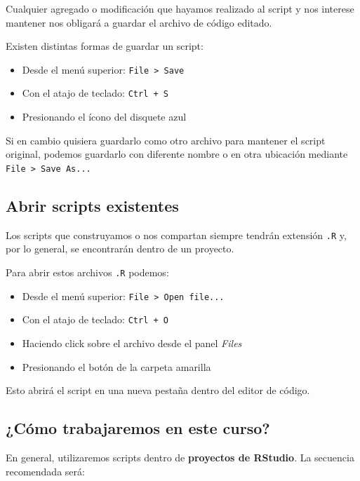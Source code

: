 \documentclass[
  spanish,
  a4paper,
]{scrbook}
\begin{document}
Cualquier agregado o modificación que hayamos realizado al script y nos
interese mantener nos obligará a guardar el archivo de código editado.

Existen distintas formas de guardar un script:

\begin{itemize}
\item
  Desde el menú superior: \texttt{File\ \textgreater{}\ Save}
\item
  Con el atajo de teclado: \texttt{Ctrl\ +\ S}
\item
  Presionando el ícono del disquete azul 💾
\end{itemize}

Si en cambio quisiera guardarlo como otro archivo para mantener el
script original, podemos guardarlo con diferente nombre o en otra
ubicación mediante \texttt{File\ \textgreater{}\ Save\ As...}

\subsection{Abrir scripts existentes}\label{abrir-scripts-existentes}

Los scripts que construyamos o nos compartan siempre tendrán extensión
\texttt{.R} y, por lo general, se encontrarán dentro de un proyecto.

Para abrir estos archivos \texttt{.R} podemos:

\begin{itemize}
\item
  Desde el menú superior: \texttt{File\ \textgreater{}\ Open\ file...}
\item
  Con el atajo de teclado: \texttt{Ctrl\ +\ O}
\item
  Haciendo click sobre el archivo desde el panel \emph{Files}
\item
  Presionando el botón de la carpeta amarilla 📂
\end{itemize}

Esto abrirá el script en una nueva pestaña dentro del editor de código.

\subsection{¿Cómo trabajaremos en este
curso?}\label{cuxf3mo-trabajaremos-en-este-curso}

En general, utilizaremos scripts dentro de \textbf{proyectos de
RStudio}. La secuencia recomendada será:
\end{document}
